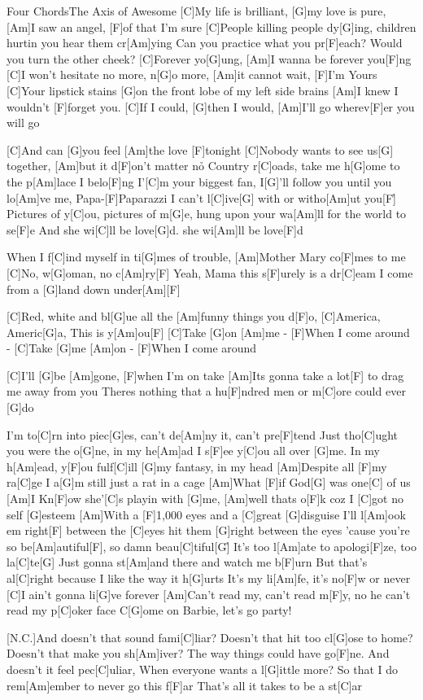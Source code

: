 \documentclass[../main.tex]{subfiles}
\begin{document}
\begin{song}[4]{Four Chords}{The Axis of Awesome}{}
[C]My life is brilliant, [G]my love is pure, 
[Am]I saw an angel, [F]of that I'm sure
[C]People killing people dy[G]ing, children hurtin you hear them cr[Am]ying
Can you practice what you pr[F]each? Would you turn the other cheek?
[C]Forever yo[G]ung, [Am]I wanna be forever you[F]ng
[C]I won't hesitate no more, n[G]o more, 
[Am]it cannot wait, [F]I'm Yours
[C]Your lipstick stains [G]on the front lobe of my left side brains
[Am]I knew I wouldn't [F]forget you. 
[C]If I could, [G]then I would, [Am]I'll go wherev[F]er you will go

[C]And can [G]you feel [Am]the love [F]tonight
[C]Nobody wants to see us[G] together, [Am]but it d[F]on't matter no\h {}
Country r[C]oads, take me h[G]ome to the p[Am]lace I belo[F]ng
I'[C]m your biggest fan, I[G]'ll follow you until you lo[Am]ve me, Papa-[F]Paparazzi
I can't l[C]ive[G] with or witho[Am]ut you[F]{\h}
Pictures of y[C]ou, pictures of m[G]e, hung upon your wa[Am]ll for the world to se[F]e
And she wi[C]ll be love[G]d. she wi[Am]ll be love[F]d

When I f[C]ind myself in ti[G]mes of trouble, [Am]Mother Mary co[F]mes to me
[C]No, w[G]oman, no c[Am]ry[F]{\hh}
Yeah, Mama this s[F]urely is a dr[C]eam
I come from a [G]land down under[Am]{\hh}[F]{\hh}

[C]Red, white and bl[G]ue all the [Am]funny things you d[F]o, [C]America, Americ[G]a, This is y[Am]ou[F]{\hh}
[C]Take [G]on [Am]me - [F]When I come around - [C]Take [G]me [Am]on - [F]When I come around

[C]I'll [G]be [Am]gone, [F]when I'm on take
[Am]Its gonna take a lot[F] to drag me away from you
Theres nothing that a hu[F]ndred men or m[C]ore could ever [G]do

I'm to[C]rn into piec[G]es, can't de[Am]ny it, can't pre[F]tend
Just tho[C]ught you were the o[G]ne, in my he[Am]ad I s[F]ee y[C]ou all over [G]me.
In my h[Am]ead, y[F]ou fulf[C]ill [G]my fantasy, in my head
[Am]Despite all [F]my ra[C]ge I a[G]m still just a rat in a cage
[Am]What [F]if God[G] was one[C] of us
[Am]I Kn[F]ow she'[C]s playin with [G]me, [Am]well thats o[F]k coz I [C]got no self [G]esteem
[Am]With a [F]1,000 eyes and a [C]great [G]disguise I'll l[Am]ook em right[F] between the [C]eyes
hit them [G]right between the eyes
\pagebreak
'cause you're so be[Am]autiful[F], so damn beau[C]tiful[G]{\h}
It's too l[Am]ate to apologi[F]ze, too la[C]te[G]
Just gonna st[Am]and there and watch me b[F]urn
But that's al[C]right because I like the way it h[G]urts
It's my li[Am]fe, it's no[F]w or never
[C]I ain't gonna li[G]ve forever
[Am]Can't read my, can't read m[F]y, no he can't read my p[C]oker face
C[G]ome on Barbie, let's go party!

[N.C.]And doesn't that sound fami[C]liar?
Doesn't that hit too cl[G]ose to home?
Doesn't that make you sh[Am]iver?
The way things could have go[F]ne.
And doesn't it feel pec[C]uliar,
When everyone wants a l[G]ittle more?
So that I do rem[Am]ember to never go this f[F]ar
That's all it takes to be a st[C]ar

\end{song}
\end{document}
